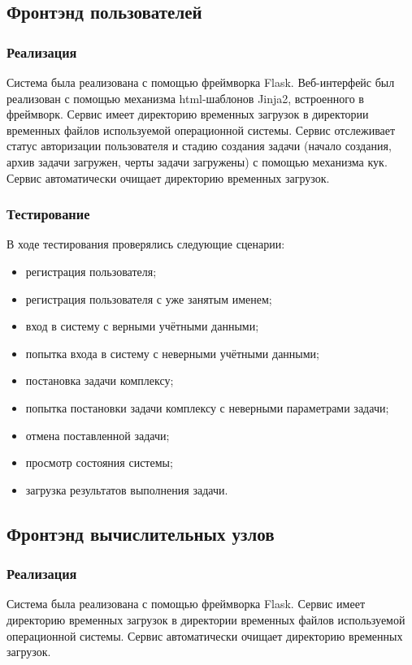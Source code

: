 \documentclass[a4paper,12pt]{report}
\numberwithin{equation}{section}
\begin{document}
  \subsection{Фронтэнд пользователей}
  \subsubsection{Реализация}
  Система была реализована с помощью фреймворка Flask.
  Веб-интерфейс был реализован с помощью механизма html-шаблонов Jinja2, встроенного в фреймворк.
  Сервис имеет директорию временных загрузок в директории временных файлов используемой операционной системы.
  Сервис отслеживает статус авторизации пользователя и стадию создания задачи (начало создания, архив задачи загружен, черты задачи загружены) с помощью механизма кук.
  Сервис автоматически очищает директорию временных загрузок.
  
  \subsubsection{Тестирование}
  В ходе тестирования проверялись следующие сценарии:
  
  \begin{itemize}
    \item регистрация пользователя;
    \item регистрация пользователя с уже занятым именем;
    \item вход в систему с верными учётными данными;
    \item попытка входа в систему с неверными учётными данными;
    \item постановка задачи комплексу;
    \item попытка постановки задачи комплексу с неверными параметрами задачи;
    \item отмена поставленной задачи;
    \item просмотр состояния системы;
    \item загрузка результатов выполнения задачи.
  \end{itemize}
  
  \subsection{Фронтэнд вычислительных узлов}
  \subsubsection{Реализация}
  Система была реализована с помощью фреймворка Flask.
  Сервис имеет директорию временных загрузок в директории временных файлов используемой операционной системы.
  Сервис автоматически очищает директорию временных загрузок.
  
\end{document}

